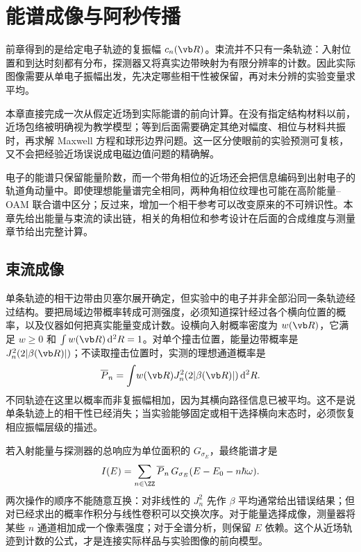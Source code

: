 \chapter{能谱成像与阿秒传播}
\label{chap:pinem-measurements}

前章得到的是给定电子轨迹的复振幅 $c_n(\vb R)$。束流并不只有一条轨迹：入射位置和到达时刻都有分布，探测器又将真实边带映射为有限分辨率的计数。因此实际图像需要从单电子振幅出发，先决定哪些相干性被保留，再对未分辨的实验变量求平均。

本章直接完成一次从假定近场到实际能谱的前向计算。在没有指定结构材料以前，近场包络被明确视为教学模型；等到后面需要确定其绝对幅度、相位与材料共振时，再求解 Maxwell 方程和球形边界问题。这一区分使眼前的实验预测可复核，又不会把经验近场误说成电磁边值问题的精确解。

电子的能谱只保留能量阶数，而一个带角相位的近场还会把信息编码到出射电子的轨道角动量中。即使理想能量谱完全相同，两种角相位纹理也可能在高阶能量--OAM 联合谱中区分；反过来，增加一个相干参考可以改变原来的不可辨识性。本章先给出能量与束流的读出链，相关的角相位和参考设计在后面的合成维度与测量章节给出完整计算。


\section{束流成像}
单条轨迹的相干边带由贝塞尔展开确定，但实验中的电子并非全部沿同一条轨迹经过结构。要把局域边带概率转成可测强度，必须知道探针经过各个横向位置的概率，以及仪器如何把真实能量变成计数。设横向入射概率密度为 $w(\vb R)$，它满足 $w\geq0$ 和 $\int w(\vb R)\,\dd^2R=1$。对单个撞击位置，能量边带概率是 $J_n^2(2|\beta(\vb R)|)$；不读取撞击位置时，实测的理想通道概率是
\begin{equation}
\overline P_n=\int\!w(\vb R)J_n^2(2|\beta(\vb R)|)\,\dd^2R.
\label{eq:beam-averaged-pinem-probability}
\end{equation}
不同轨迹在这里以概率而非复振幅相加，因为其横向路径信息已被平均。这不是说单条轨迹上的相干性已经消失；当实验能够固定或相干选择横向末态时，必须恢复相应振幅层级的描述。

若入射能量与探测器的总响应为单位面积的 $G_{\sigma_E}$，最终能谱才是
\begin{equation}
I(E)=\sum_{n\in\ZZ}\overline P_n\,
G_{\sigma_E}(E-E_0-n\hbar\omega).
\label{eq:averaged-observed-pinem-spectrum}
\end{equation}
两次操作的顺序不能随意互换：对非线性的 $J_n^2$ 先作 $\beta$ 平均通常给出错误结果；但对已经求出的概率作积分与线性卷积可以交换次序。对于能量选择成像，测量器将某些 $n$ 通道相加成一个像素强度；对于全谱分析，则保留 $E$ 依赖。这个从近场轨迹到计数的公式，才是连接实际样品与实验图像的前向模型。

